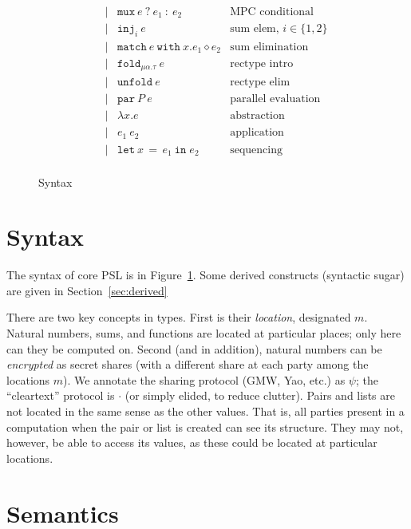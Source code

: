 \documentclass[10pt]{article}
\newcommand{\kw}[1]{\ensuremath{\mathtt{#1}}}
\newcommand{\trec}[2]{\ensuremath{\mu {#1}.{#2}}}
\newcommand{\elet}[3]{\ensuremath{\kw{let}~#1\, =\, #2~\kw{in}\;{#3}}}
\newcommand{\epar}[2]{\ensuremath{\kw{par}~{#1}~{#2}}}
\newcommand{\econd}[3]{\ensuremath{\kw{match}~{#1}~\kw{with}~x.{#2} \diamond {#3}}}
\newcommand{\emux}[3]{\ensuremath{\kw{mux}~{#1}~\kw{?}~{#2}~\kw{:}~{#3}}}
\newcommand{\einj}[2]{\ensuremath{\kw{inj}_{#1}~{#2}}}
\newcommand{\elam}[2]{\ensuremath{\lambda {#1}.{#2}}}
\newcommand{\eapp}[2]{\ensuremath{{#1}~{#2}}}
\newcommand{\efold}[2]{\ensuremath{\kw{fold}_{#1}~{#2}}}
\newcommand{\eunfold}[1]{\ensuremath{\kw{unfold}~{#1}}}
\begin{document}
\begin{figure}[h]
\[\begin{array}{rlcll}
                       && \mid & \emux{e}{e_1}{e_2}  & \text{MPC conditional} \\
                       && \mid & \einj{i}{e} & \text{sum elem, }i \in \{1,2\}\\
                       && \mid & \econd{e}{e_1}{e_2}  & \text{sum elimination} \\
                       && \mid & \efold{\trec{\alpha}{\tau}}{e} & \text{rectype intro}\\
                       && \mid & \eunfold{e} & \text{rectype elim}\\
                       && \mid & \epar{P}{e} & \text{parallel evaluation}\\
                       && \mid & \elam{x}{e}  & \text{abstraction} \\
                       && \mid & \eapp{e_1}{e_2}  & \text{application} \\
                       && \mid & \elet{x}{e_1}{e_2}  & \text{sequencing} \\
  \end{array}
  \]
  \caption{Syntax}
  \label{fig:syntax}
\end{figure}

\newpage

\section{Syntax}
  
The syntax of core PSL is in Figure~\ref{fig:syntax}. Some derived
constructs (syntactic sugar) are given in Section~\ref{sec:derived}

There are two key concepts in types. First is their \emph{location},
designated $m$. Natural numbers, sums, and functions are located at
particular places; only here can they be computed on. Second (and in
addition), natural numbers can be \emph{encrypted} as secret
shares (with a different share at each party among the locations
$m$). We annotate the sharing protocol (GMW, Yao, etc.) as $\psi$; the
``cleartext'' protocol is $\cdot$ (or simply elided, to reduce
clutter). Pairs and lists are not located in the same sense as the
other values. That is, all parties present in a computation when the
pair or list is created can see its structure. They may not, however,
be able to access its values, as these could be located at particular
locations.

\section{Semantics}
\end{document}
